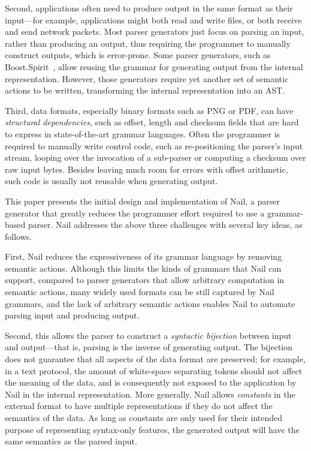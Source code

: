 Second,  applications often need to produce output in the same
format as their input---for example, applications might both
read and write files, or both receive and send network packets.
Most parser generators just focus on parsing an input, rather
than producing an output, thus requiring the programmer to manually
construct outputs, which is error-prone.  Some parser generators, such as
Boost.Spirit~\cite{boost-spirit},
allow reusing the grammar for generating output from the internal
representation.  However, those generators require yet another set of
semantic actions to be written, transforming the internal representation
into an AST\@.


Third, data formats, especially binary formats such as PNG or PDF, can have \emph{structural dependencies}, such as offset, length and checksum fields
that are hard to express in state-of-the-art grammar languages. Often the programmer is required to
manually write control code, such as re-positioning the parser's input stream, looping over the
invocation of a sub-parser or computing a
checksum over raw input bytes.  Besides leaving much room for errors with offset arithmetic, such
code is usually not reusable when generating output.


This paper presents the initial design and implementation of Nail, a parser
generator that greatly reduces the programmer effort required to use a
grammar-based parser. Nail addresses the above three challenges with
several key ideas, as follows.

First, Nail reduces the expressiveness of its grammar language by
removing semantic actions. Although this limits the kinds of grammars that
Nail can support, compared to parser generators that allow arbitrary
computation in semantic actions, many widely used formats can be still
captured by Nail grammars, and the lack of arbitrary semantic actions
enables Nail to automate parsing input and producing output.


Second, this allows the parser to construct a \emph{syntactic bijection}
between input and output---that is, parsing is the inverse of generating
output.  The bijection does not guarantee that all aspects of the data
format are preserved; for example, in a text protocol, the amount of
white-space separating tokens should not affect the meaning of the
data, and is consequently not exposed to the application by Nail in the
internal representation.  More generally, Nail allows \emph{constants}
in the external format to have multiple representations if they do not
affect the semantics of the data.  As long as constants are only used
for their intended purpose of representing syntax-only features, the
generated output will have the same semantics as the parsed input.

